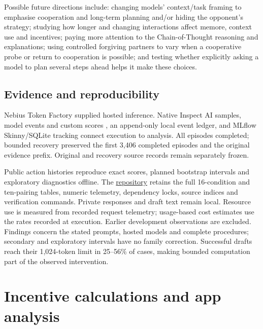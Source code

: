 \documentclass[11pt,a4paper]{article}
\begin{document}
Possible future directions include: changing models' context/task framing to emphasise cooperation and long-term planning and/or hiding the opponent's strategy;
studying how longer and changing interactions affect memore, context use and incentives;
paying more attention to the Chain-of-Thought reasoning and explanations; 
using controlled forgiving partners to vary when a cooperative probe or return
to cooperation is possible; and testing whether explicitly asking a model to plan several steps ahead helps it make these choices.




\subsection*{Evidence and reproducibility}
Nebius Token Factory supplied hosted inference. Native Inspect AI samples,
model events and custom scores \cite{inspect}, an append-only local event
ledger, and MLflow Skinny/SQLite tracking \cite{mlflow} connect execution to
analysis. All episodes completed; bounded recovery preserved the first 3,406
completed episodes and the original evidence prefix. Original and recovery
source records remain separately frozen.

Public action histories reproduce exact scores, planned bootstrap intervals
and exploratory diagnostics offline. The
\href{https://github.com/sheinkmana/dilemma-dynamics}{repository} retains the
full 16-condition and ten-pairing tables, numeric telemetry, dependency locks,
source indices and verification commands. Private responses and draft text
remain local. Resource use is measured from recorded request telemetry;
usage-based cost estimates use the rates recorded at execution. Earlier
development observations are excluded. Findings concern
the stated prompts, hosted models and complete procedures; secondary and
exploratory intervals have no family correction. Successful drafts reach their
1,024-token limit in 25--56\% of cases, making bounded computation part of the
observed intervention.

\clearpage
\appendix
\section{Incentive calculations and app analysis}
\label{app:incentives}
\end{document}

